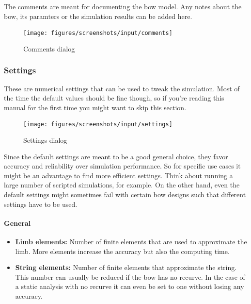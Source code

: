 \documentclass[12pt]{article}
\begin{document}
The comments are meant for documenting the bow model.
Any notes about the bow, its paramters or the simulation results can be added here.
\bigskip

\begin{figure}[H]
\centering
\texttt{[image: figures/screenshots/input/comments]}
\caption{Comments dialog}
\label{fig:comments}
\end{figure}

\subsubsection{Settings}

These are numerical settings that can be used to tweak the simulation.
Most of the time the default values should be fine though, so if you're reading this manual for the first time you might want to skip this section.

\bigskip

\begin{figure}[H]
\centering
\texttt{[image: figures/screenshots/input/settings]}
\caption{Settings dialog}
\label{fig:settings}
\end{figure}

\newpage

Since the default settings are meant to be a good general choice, they favor accuracy and reliability over simulation performance.
So for specific use cases it might be an advantage to find more efficient settings.
Think about running a large number of scripted simulations, for example.
On the other hand, even the default settings might sometimes fail with certain bow designs such that different settings have to be used.

\paragraph*{General}

\begin{itemize}
\item \textbf{Limb elements:} Number of finite elements that are used to approximate the limb. More elements increase the accuracy but also the computing time.
\item \textbf{String elements:} Number of finite elements that approximate the string. This number can usually be reduced if the bow has no recurve. In the case of a static analysis with no recurve it can even be set to one without losing any accuracy.
\end{itemize}
\end{document}
